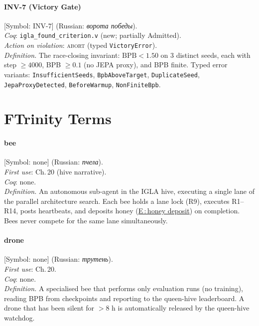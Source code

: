 \paragraph*{\textmd{\textbf{INV-7 (Victory Gate)}}}
\label{entry:inv7}
[Symbol: $\mathrm{INV}\text{-}7$] (Russian: \textit{ворота победы}).\\
\textit{Coq}: \texttt{igla\_found\_criterion.v} (new; partially Admitted).\\
\textit{Action on violation}: \textsc{abort} (typed \texttt{VictoryError}).\\
\textit{Definition.}
The race-closing invariant: $\mathrm{BPB} < 1.50$ on 3 distinct seeds,
each with step $\ge 4000$, BPB $\ge 0.1$ (no JEPA proxy), and BPB finite.
Typed error variants: \texttt{InsufficientSeeds}, \texttt{BpbAboveTarget},
\texttt{DuplicateSeed}, \texttt{JepaProxyDetected}, \texttt{BeforeWarmup},
\texttt{NonFiniteBpb}.

\bigskip

\section*{F\quad Trinity Terms}
\label{sec:lexicon-trinity}

\paragraph*{\textmd{\textbf{bee}}}
\label{entry:bee}
[Symbol: none] (Russian: \textit{пчела}).\\
\textit{First use}: Ch.\,20 (hive narrative).\\
\textit{Coq}: none.\\
\textit{Definition.}
An autonomous sub-agent in the IGLA hive, executing a single lane of
the parallel architecture search.
Each bee holds a lane lock (R9), executes R1–R14, posts heartbeats,
and deposits honey (\hyperref[entry:honey]{E\,:\,honey deposit}) on completion.
Bees never compete for the same lane simultaneously.

\paragraph*{\textmd{\textbf{drone}}}
\label{entry:drone}
[Symbol: none] (Russian: \textit{трутень}).\\
\textit{First use}: Ch.\,20.\\
\textit{Coq}: none.\\
\textit{Definition.}
A specialised bee that performs only evaluation runs (no training),
reading BPB from checkpoints and reporting to the queen-hive leaderboard.
A drone that has been silent for $> 8$ h is automatically released
by the queen-hive watchdog.

